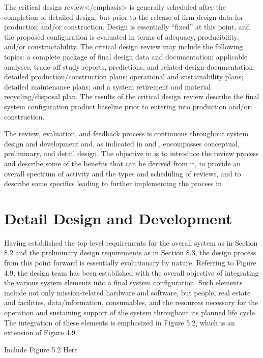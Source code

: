 The critical design review</emphasis> is generally scheduled after the completion of detailed design, but prior to the release of firm design data for production and/or construction. Design is essentially ``fixed'' at this point, and the proposed configuration is evaluated in terms of adequacy, producibility, and/or constructability. The critical design review may include the following topics: a complete package of final design data and documentation; applicable analyses, trade-off study reports, predictions, and related design documentation; detailed production/construction plans; operational and sustainability plans; detailed maintenance plans; and a system retirement and material recycling/disposal plan. The results of the critical design review describe the final system configuration product baseline prior to entering into production and/or construction.

The review, evaluation, and feedback process is continuous throughout system design and development and, as indicated in and , encompasses conceptual, preliminary, and detail design. The objective in is to introduce the review process and describe some of the benefits that can be derived from it, to provide an overall spectrum of activity and the types and scheduling of reviews, and to describe some specifics leading to further implementing the process in


\section{Detail Design and Development}

Having established the top-level requirements for the overall system as in Section 8.2 and the preliminary design requirements as in Section 8.3, the design process from this point forward is essentially evolutionary by nature. Referring to Figure 4.9, the design team has been established with the overall objective of integrating the various system elements into a final system configuration. Such elements include not only mission-related hardware and software, but people, real estate and facilities, data/information, consumables, and the resources necessary for the operation and sustaining support of the system throughout its planned life cycle. The integration of these elements is emphasized in Figure 5.2, which is an extension of Figure 4.9.

Include Figure 5.2 Here

